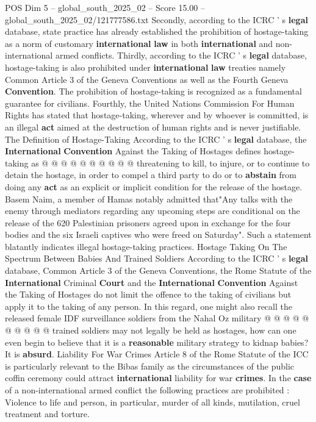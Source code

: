 \begin{textsample}{POS Dim 5 – global\_south\_2025\_02 – Score 15.00 – global\_south\_2025\_02/121777586.txt}
Secondly, according to the ICRC ' s \textbf{legal} database, state practice has already established the prohibition of hostage-taking as a norm of customary \textbf{international} \textbf{law} in both \textbf{international} and non-international armed conflicts.
Thirdly, according to the ICRC ' s \textbf{legal} database, hostage-taking is also prohibited under \textbf{international} \textbf{law} treaties namely Common Article 3 of the Geneva Conventions as well as the Fourth Geneva \textbf{Convention}.
The prohibition of hostage-taking is recognized as a fundamental guarantee for civilians.
Fourthly, the United Nations Commission For Human Rights has stated that hostage-taking, wherever and by whoever is committed, is an illegal \textbf{act} aimed at the destruction of human rights and is never justifiable.
The Definition of Hostage-Taking According to the ICRC ' s \textbf{legal} database, the \textbf{International} \textbf{Convention} Against the Taking of Hostages defines hostage-taking as @ @ @ @ @ @ @ @ @ @ threatening to kill, to injure, or to continue to detain the hostage, in order to compel a third party to do or to \textbf{abstain} from doing any \textbf{act} as an explicit or implicit condition for the release of the hostage.
Basem Naim, a member of Hamas notably admitted that"Any talks with the enemy through mediators regarding any upcoming steps are conditional on the release of the 620 Palestinian prisoners agreed upon in exchange for the four bodies and the six Israeli captives who were freed on Saturday".
Such a statement blatantly indicates illegal hostage-taking practices.
Hostage Taking On The Spectrum Between Babies And Trained Soldiers According to the ICRC ' s \textbf{legal} database, Common Article 3 of the Geneva Conventions, the Rome Statute of the \textbf{International} Criminal \textbf{Court} and the \textbf{International} \textbf{Convention} Against the Taking of Hostages do not limit the offence to the taking of civilians but apply it to the taking of any person.
In this regard, one might also recall the released female IDF surveillance soldiers from the Nahal Oz military @ @ @ @ @ @ @ @ @ @ trained soldiers may not legally be held as hostages, how can one even begin to believe that it is a \textbf{reasonable} military strategy to kidnap babies?
It is \textbf{absurd}.
Liability For War Crimes Article 8 of the Rome Statute of the ICC is particularly relevant to the Bibas family as the circumstances of the public coffin ceremony could attract \textbf{international} liability for war \textbf{crimes}.
In the \textbf{case} of a non-international armed conflict the following practices are prohibited : Violence to life and person, in particular, murder of all kinds, mutilation, cruel treatment and torture.

\end{textsample}
